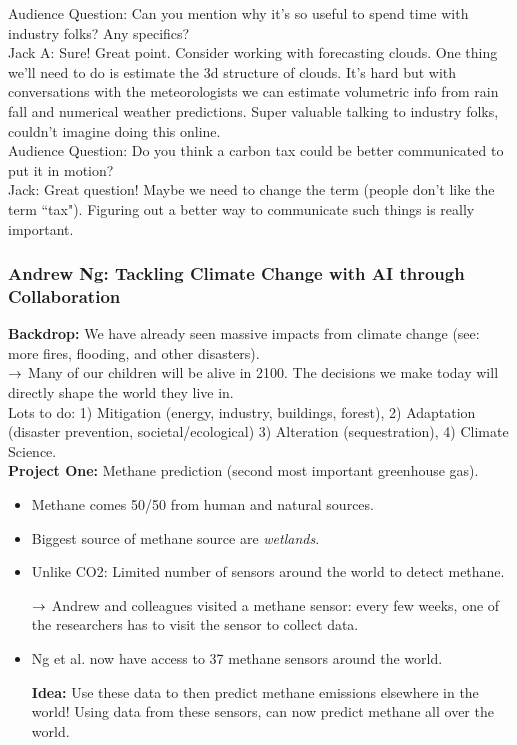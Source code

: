 Audience Question: Can you mention why it's so useful to spend time with industry folks? Any specifics? \\

Jack A: Sure! Great point. Consider working with forecasting clouds. One thing we'll need to do is estimate the 3d structure of clouds. It's hard but with conversations with the meteorologists we can estimate volumetric info from rain fall and numerical weather predictions. Super valuable talking to industry folks, couldn't imagine doing this online. \\

Audience Question: Do you think a carbon tax could be better communicated to put it in motion? \\

Jack: Great question! Maybe we need to change the term (people don't like the term ``tax"). Figuring out a better way to communicate such things is really important.

\spacerule

\subsubsection{Andrew Ng: Tackling Climate Change with AI through Collaboration}

{\bf Backdrop:} We have already seen massive impacts from climate change (see: more fires, flooding, and other disasters). \\

$\rightarrow$ Many of our children will be alive in 2100. The decisions we make today will directly shape the world they live in. \\

Lots to do: 1) Mitigation (energy, industry, buildings, forest), 2) Adaptation (disaster prevention, societal/ecological) 3) Alteration (sequestration), 4) Climate Science. \\

{\bf Project One:} Methane prediction (second most important greenhouse gas).
\begin{itemize}
    \item Methane comes 50/50 from human and natural sources.
    \item Biggest source of methane source are {\it wetlands}.
    \item Unlike CO2: Limited number of sensors around the world to detect methane.
    
    $\rightarrow$ Andrew and colleagues visited a methane sensor: every few weeks, one of the researchers has to visit the sensor to collect data.
    \item Ng et al. now have access to 37 methane sensors around the world.
    
    {\bf Idea:} Use these data to then predict methane emissions elsewhere in the world! Using data from these sensors, can now predict methane all over the world.
\end{itemize}

